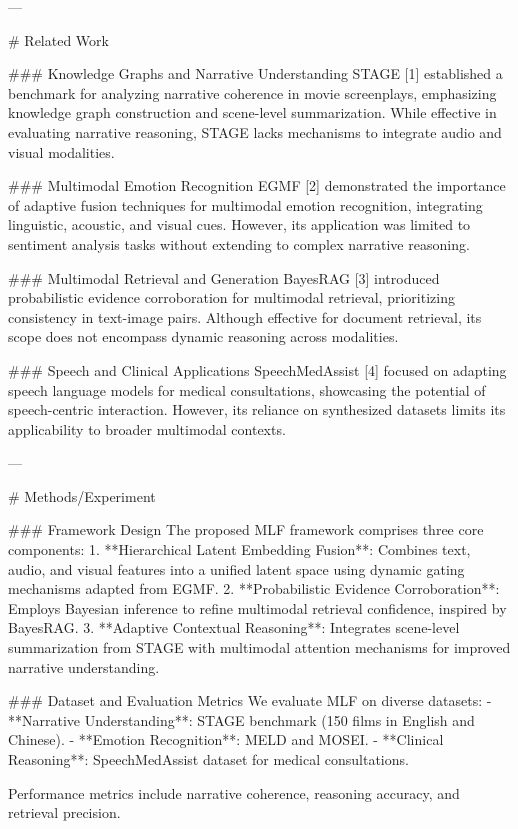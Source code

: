 ---

# Related Work

### Knowledge Graphs and Narrative Understanding
STAGE [1] established a benchmark for analyzing narrative coherence in movie screenplays, emphasizing knowledge graph construction and scene-level summarization. While effective in evaluating narrative reasoning, STAGE lacks mechanisms to integrate audio and visual modalities.

### Multimodal Emotion Recognition
EGMF [2] demonstrated the importance of adaptive fusion techniques for multimodal emotion recognition, integrating linguistic, acoustic, and visual cues. However, its application was limited to sentiment analysis tasks without extending to complex narrative reasoning.

### Multimodal Retrieval and Generation
BayesRAG [3] introduced probabilistic evidence corroboration for multimodal retrieval, prioritizing consistency in text-image pairs. Although effective for document retrieval, its scope does not encompass dynamic reasoning across modalities.

### Speech and Clinical Applications
SpeechMedAssist [4] focused on adapting speech language models for medical consultations, showcasing the potential of speech-centric interaction. However, its reliance on synthesized datasets limits its applicability to broader multimodal contexts.

---

# Methods/Experiment

### Framework Design
The proposed MLF framework comprises three core components:
1. **Hierarchical Latent Embedding Fusion**: Combines text, audio, and visual features into a unified latent space using dynamic gating mechanisms adapted from EGMF.
2. **Probabilistic Evidence Corroboration**: Employs Bayesian inference to refine multimodal retrieval confidence, inspired by BayesRAG.
3. **Adaptive Contextual Reasoning**: Integrates scene-level summarization from STAGE with multimodal attention mechanisms for improved narrative understanding.

### Dataset and Evaluation Metrics
We evaluate MLF on diverse datasets:
- **Narrative Understanding**: STAGE benchmark (150 films in English and Chinese).
- **Emotion Recognition**: MELD and MOSEI.
- **Clinical Reasoning**: SpeechMedAssist dataset for medical consultations.

Performance metrics include narrative coherence, reasoning accuracy, and retrieval precision.

